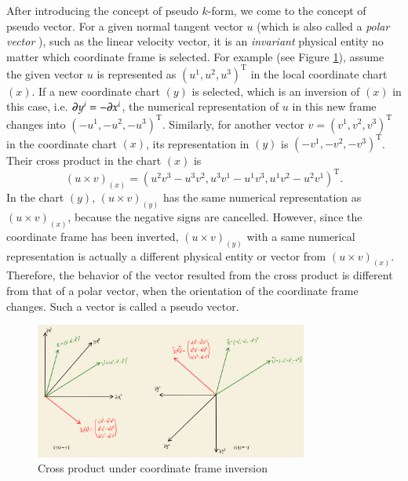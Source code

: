 \documentclass[11pt, a4paper]{book}
\begin{document}
After introducing the concept of pseudo $k$-form, we come to the concept of pseudo vector.
For a given normal tangent vector $u$ (which is also called a \emph{polar vector}
\citep{Pseudovector2023}), such as the linear velocity vector, it is an \emph{invariant}
physical entity no matter which coordinate frame is selected. For example (see Figure
\ref{fig:cross-product-under-inversion}), assume the given vector $u$ is represented as
$(u^1,u^2,u^3)^{\mathrm{T}}$ in the local coordinate chart $(x)$. If a new coordinate
chart $(y)$ is selected, which is an inversion of $(x)$ in this case, i.e.
$\boldsymbol{\partial}y^i = -\boldsymbol{\partial}x^i$, the numerical representation of $u$ in this new
frame changes into $(-u^1,-u^2,-u^3)^{\mathrm{T}}$. Similarly, for another vector
$v = (v^1,v^2,v^3)^{\mathrm{T}}$ in the coordinate chart $(x)$, its representation in
$(y)$ is $(-v^1,-v^2,-v^3)^{\mathrm{T}}$. Their cross product in the chart $(x)$ is
\begin{equation*}
  (u \times v)_{(x)} = (u^2v^3 - u^3v^2, u^3v^1 - u^1v^3, u^1v^2 - u^2v^1)^{\mathrm{T}}.
\end{equation*}
In the chart $(y)$, $(u \times v)_{(y)}$ has the same numerical representation as
$(u \times v)_{(x)}$, because the negative signs are cancelled. However, since the
coordinate frame has been inverted, $(u \times v)_{(y)}$ with a same numerical
representation is actually a different physical entity or vector from
$(u \times v)_{(x)}$. Therefore, the behavior of the vector resulted from the cross
product is different from that of a polar vector, when the orientation of the coordinate
frame changes. Such a vector is called a pseudo vector.
\begin{figure}[htbp]
  \centering
  \includegraphics[width=0.8\textwidth, height=\textheight, keepaspectratio]{figures/2023-12-27-cross-product-under-coordinate-frame-inversion}
  \caption{Cross product under coordinate frame inversion}
  \label{fig:cross-product-under-inversion}
\end{figure}
\end{document}
